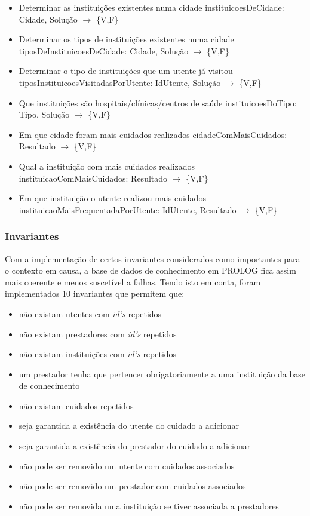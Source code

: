 \documentclass{article}
\begin{document}
\begin{itemize}
	\item Determinar as instituições existentes numa cidade
\newline
instituicoesDeCidade: Cidade, Solução $\to$ \{V,F\}
	\item Determinar os tipos de instituições existentes numa cidade
\newline
tiposDeInstituicoesDeCidade: Cidade, Solução $\to$ \{V,F\}
	\item Determinar o tipo de instituições que um utente já visitou
\newline
tiposInstituicoesVisitadasPorUtente: IdUtente, Solução $\to$ \{V,F\}
	\item Que instituições são hospitais/clínicas/centros de saúde
\newline
instituicoesDoTipo: Tipo, Solução $\to$ \{V,F\}
	\item Em que cidade foram mais cuidados realizados
\newline
cidadeComMaisCuidados: Resultado $\to$ \{V,F\}
    \item Qual a instituição com mais cuidados realizados
\newline
instituicaoComMaisCuidados: Resultado $\to$ \{V,F\}
    \item Em que instituição o utente realizou mais cuidados
\newline
instituicaoMaisFrequentadaPorUtente: IdUtente, Resultado $\to$ \{V,F\}
\end{itemize}

\subsubsection{Invariantes}

Com a implementação de certos invariantes considerados como importantes para o contexto em causa, a base de dados de conhecimento em PROLOG fica assim mais coerente e menos suscetível a falhas.
Tendo isto em conta, foram implementados 10 invariantes que permitem que:
\begin{itemize}
	\item não existam utentes com \textit{id's} repetidos
    \item não existam prestadores com \textit{id's} repetidos
    \item não existam instituições com \textit{id's} repetidos
    \item um prestador tenha que pertencer obrigatoriamente a uma instituição da base de conhecimento
    \item não existam cuidados repetidos
    \item seja garantida a existência do utente do cuidado a adicionar
    \item seja garantida a existência do prestador do cuidado a adicionar
    \item não pode ser removido um utente com cuidados associados
    \item não pode ser removido um prestador com cuidados associados
    \item não pode ser removida uma instituição se tiver associada a prestadores
\end{itemize}
\end{document}
